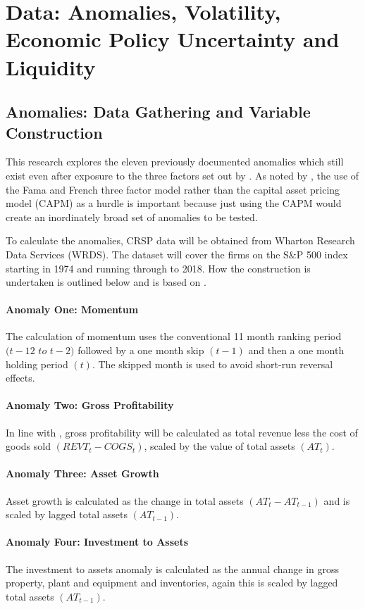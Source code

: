 \documentclass[12pt, a4paper, oneside]{article}
\begin{document}
\section{Data: Anomalies, Volatility, Economic Policy Uncertainty and Liquidity}\label{sec:data}
\subsection{Anomalies: Data Gathering and Variable Construction}
This research explores the eleven previously documented anomalies which still exist even after exposure to the three factors set out by . As noted by , the use of the Fama and French three factor model rather than the capital asset pricing model (CAPM) as a hurdle is important because just using the CAPM would create an inordinately broad set of anomalies to be tested. 

To calculate the anomalies, CRSP data will be obtained from Wharton Research Data Services (WRDS). The dataset will cover the firms on the S\&P 500 index starting in 1974 and running through to 2018. How the construction is undertaken is outlined below and is based on .

\paragraph*{Anomaly One: Momentum}
The calculation of momentum uses the conventional 11 month ranking period $(t-12$ $to$ $t-2)$ followed by a one month skip $(t-1)$ and then a one month holding period $(t)$. The skipped month is used to avoid short-run reversal effects.

\paragraph*{Anomaly Two: Gross Profitability}
In line with , gross profitability will be calculated as total revenue less the cost of goods sold \((REVT_t-COGS_t)\), scaled by the value of total assets $(AT_t)$. 

\paragraph*{Anomaly Three: Asset Growth}
Asset growth is calculated as the change in total assets \((AT_t  - AT_{t-1})\) and is scaled by lagged total assets \((AT_{t-1})\).

\paragraph*{Anomaly Four: Investment to Assets}
The investment to assets anomaly is calculated as the annual change in gross property, plant and equipment and inventories, again this is scaled by lagged total assets \((AT_{t-1})\). 
\end{document}
